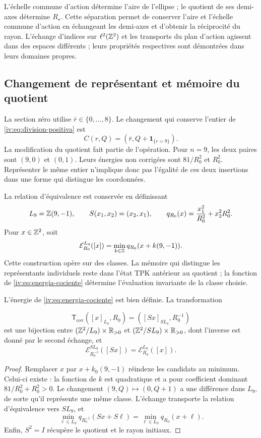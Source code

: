 L’échelle commune d’action détermine l’aire de l’ellipse ; le quotient
de ses demi-axes détermine \(R_\star\). Cette séparation permet de conserver
l’aire et l’échelle commune d’action en échangeant les demi-axes et d’obtenir la réciprocité
du rayon. L’échange d’indices sur \(\ell^2(\mathbb Z^2)\)
et les transports du plan d’action agissent dans des espaces différents ;
leurs propriétés respectives sont démontrées dans leurs domaines propres.


\subsection{Changement de représentant et mémoire du quotient}

La section zéro utilise \(\bar r\in\{0,\ldots,8\}\). Le changement
qui conserve l’entier de \eqref{iv:eq:division-positiva} est
\begin{equation}
 C(r,Q)=(\bar r,Q+\mathbf1_{\{r=9\}}).
 \label{iv:eq:cambio-seccion}
\end{equation}
La modification du quotient fait partie de l’opération.
Pour \(n=9\), les deux paires sont \((9,0)\) et \((0,1)\).
Leurs énergies non corrigées sont \(81/R_0^2\) et \(R_0^2\).
Représenter le même entier n’implique donc pas l’égalité de
ces deux insertions dans une forme qui distingue les coordonnées.

La relation d’équivalence est conservée en définissant
\[
 L_9=\mathbb Z(9,-1),\qquad S(x_1,x_2)=(x_2,x_1),
 \qquad q_{R_0}(x)=\frac{x_1^2}{R_0^2}+x_2^2R_0^2.
\]
Pour \(x\in\mathbb Z^2\), soit
\begin{equation}
 \mathcal E_{R_0}^{L_9}([x])
 =\min_{k\in\mathbb Z}q_{R_0}(x+k(9,-1)).
 \label{iv:eq:energia-cociente}
\end{equation}
Cette construction opère sur des classes. La mémoire qui distingue
les représentants individuels reste dans l’état TPK antérieur
au quotient ; la fonction de \eqref{iv:eq:energia-cociente}
détermine l’évaluation invariante de la classe choisie.

\begin{theorem}
\label{iv:thm:dualidad-cociente}
L’énergie de \eqref{iv:eq:energia-cociente} est bien définie.
La transformation

\[
 \mathsf T_{\mathrm{cov}}([x]_{L_9},R_0)
 =([Sx]_{SL_9},R_0^{-1})
\]
est une bijection entre
\((\mathbb Z^2/L_9)\times\mathbb R_{>0}\) et
\((\mathbb Z^2/SL_9)\times\mathbb R_{>0}\), dont l’inverse est donné par le
second échange, et
\[
 \mathcal E_{R_0^{-1}}^{SL_9}([Sx])
 =\mathcal E_{R_0}^{L_9}([x]).
\]
\end{theorem}
\begin{proof}
Remplacer \(x\) par \(x+k_0(9,-1)\) réindexe les candidats
au minimum. Celui-ci existe : la fonction de \(k\) est quadratique et
a pour coefficient dominant \(81/R_0^2+R_0^2>0\). Le changement
\((9,Q)\mapsto(0,Q+1)\) a une différence dans \(L_9\), de
sorte qu’il représente une même classe. L’échange transporte
la relation d’équivalence vers \(SL_9\), et
\[
 \min_{\ell\in L_9}q_{R_0^{-1}}(Sx+S\ell)
 =\min_{\ell\in L_9}q_{R_0}(x+\ell).
\]
Enfin, \(S^2=I\) récupère le quotient et le rayon initiaux.

\end{proof}

